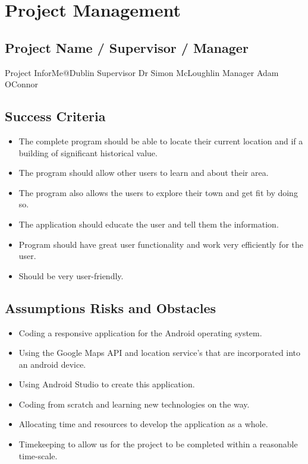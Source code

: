\chapter{Project Management}

\section{Project Name / Supervisor / Manager }    Project \hspace{2mm} \textemdash \hspace{2mm} InforMe@Dublin
\newline
Supervisor \hspace{2mm} \textemdash \hspace{2mm}  Dr Simon McLoughlin
\newline
Manager \hspace{2mm} \textemdash \hspace{2mm}  Adam O\textquotesingle Connor

\section{Success Criteria}
\begin{itemize}
	\item The complete program should be able to locate their current location and if a building of significant historical value.
	\item The program should allow other users to learn and about their area.
	\item The program also allows the users to explore their town and get fit by doing so.
	\item The application should educate the user and tell them the information.
	\item Program should have great user functionality and work very efficiently for the user.
	\item Should be very user-friendly.
\end{itemize}

\section{Assumptions Risks and Obstacles }
\begin{itemize}
	\item Coding a responsive application for the Android operating system.
	\item Using the Google Maps API and location service's that are incorporated into an android device.
	\item Using Android Studio to create this application.
	\item Coding from scratch and learning new technologies on the way.
	\item Allocating time and resources to develop the application as a whole.
	\item Timekeeping to allow us for the project to be completed within a reasonable time-scale.
\end{itemize}


